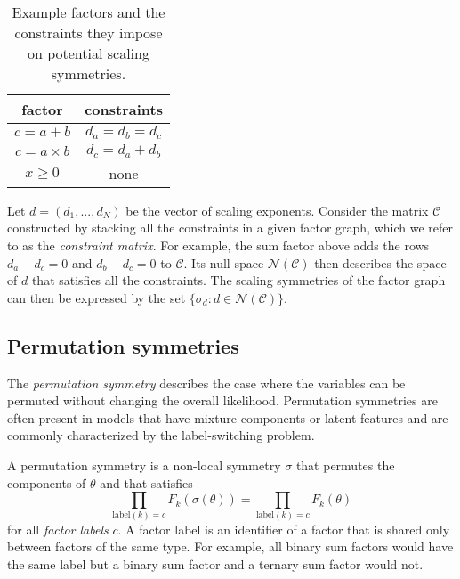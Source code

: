 \begin{table}[b]
\centering
\begin{tabular}{|c|c|}
\hline
factor & constraints \\
\hline
$c=a+b$ & $d_a = d_b = d_c$ \\
$c = a\times b$ & $d_c= d_a + d_b$ \\
$x\geq0$ & none \\
\hline
\end{tabular}
\caption{Example factors and the constraints they impose on potential scaling symmetries.}
\label{tab:scaling}
\end{table}

Let $d=(d_1,...,d_N)$ be the vector of scaling exponents. Consider the matrix $\mathcal{C}$ constructed by stacking all the constraints in a given factor graph, which we refer to as the \textit{constraint matrix}. For example, the sum factor above adds the rows $d_a-d_c=0$ and $d_b-d_c=0$ to $\mathcal{C}$. Its null space $\mathcal{N}(\mathcal{C})$ then describes the space of $d$ that satisfies all the constraints. The scaling symmetries of the factor graph can then be expressed by the set $\{\sigma_d:d\in\mathcal{N}(\mathcal{C})\}$.


\subsection{Permutation symmetries} \label{sec:permutation}

The \textit{permutation symmetry} describes the case where the variables can be permuted without changing the overall likelihood. Permutation symmetries are often present in models that have mixture components or latent features and are commonly characterized by the label-switching problem.

\begin{defn}
A permutation symmetry is a non-local symmetry $\sigma$ that permutes the components of $\theta$ and that satisfies
\[
\prod_{\text{label}(k)=c}F_k(\sigma(\theta)) = \prod_{\text{label}(k)=c}F_k(\theta)
\]
for all \textit{factor labels} $c$. A factor label is an identifier of a factor that is shared only between factors of the same type. For example, all binary sum factors would have the same label but a binary sum factor and a ternary sum factor would not.
\end{defn}

